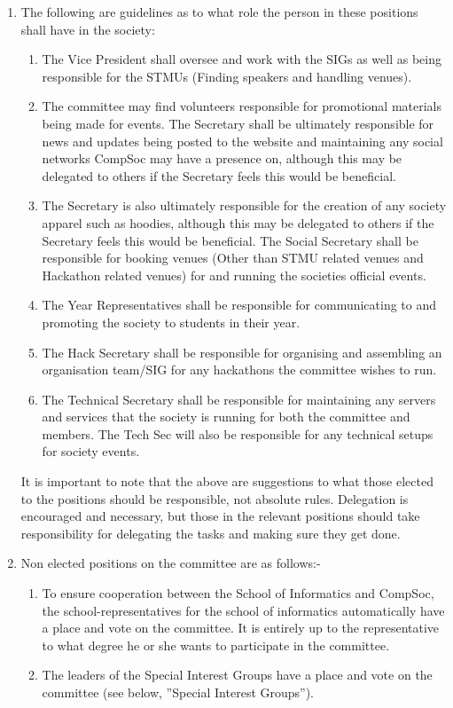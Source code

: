 \documentclass{article}
\begin{document}
\begin {enumerate}
  \item The following are guidelines as to what role the person in these positions shall have in the society:
    \begin{enumerate}
      \item The Vice President shall oversee and work with the SIGs as well as
        being responsible for the STMUs (Finding speakers and handling venues).
      \item The committee may find volunteers responsible for promotional materials
        being made for events. The Secretary shall be ultimately
        responsible for news and updates being posted to the website and
        maintaining any social networks CompSoc may have a presence on,
        although this may be delegated to others if the Secretary feels this
        would be beneficial.
      \item The Secretary is also ultimately responsible for the creation of any
        society apparel such as hoodies, although this may be delegated to others
        if the Secretary feels this would be beneficial. The Social Secretary
        shall be responsible for booking venues (Other than STMU related venues 
        and Hackathon related venues) for and running the societies
        official events.
      \item The Year Representatives shall be responsible for communicating to
        and promoting the society to students in their year.
      \item The Hack Secretary shall be responsible for organising and assembling 
        an organisation team/SIG for any hackathons the committee wishes to run.
      \item The Technical Secretary shall be responsible for maintaining any servers
        and services that the society is running for both the committee and members.
        The Tech Sec will also be responsible for any technical setups for society events.
    \end{enumerate}

    It is important to note that the above are suggestions to what those elected
    to the positions should be responsible, not absolute rules. Delegation is
    encouraged and necessary, but those in the relevant positions should take
    responsibility for delegating the tasks and making sure they get done.
    
    \item Non elected positions on the committee are as follows:-
      \begin{enumerate}
        \item To ensure cooperation between the School of Informatics and CompSoc,
          the school-representatives for the school of informatics automatically
          have a place and vote on the committee. It is entirely up to
          the representative to what degree he or she wants to participate in
          the committee.
        \item The leaders of the Special Interest Groups have a place and vote on
          the committee (see below, ”Special Interest Groups”).
      \end{enumerate}


\end{enumerate}
\end{document}
